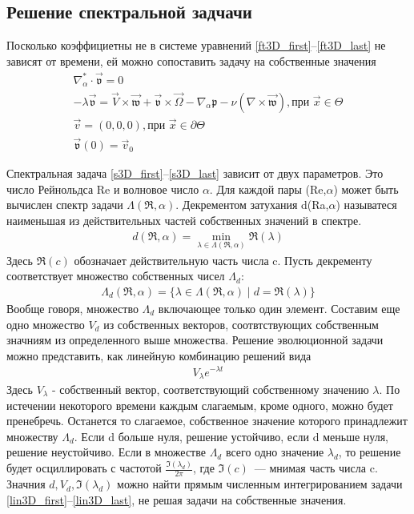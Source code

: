 \subsection{Решение спектральной задчачи}

Посколько коэффициетны не в системе уравнений \ref{ft3D_first}--\ref{ft3D_last} не зависят от времени, ей можно сопоставить задачу на собственные значения
\begin{gather} 
  \label{s3D_first}
  \nabla_\alpha^* \cdot  \mathfrak{\vec v} = 0\\
  - \lambda \mathfrak{\vec v} = \vec V \times \mathfrak{\vec w} + \mathfrak{\vec v} \times \vec \Omega - 
		\nabla_\alpha \mathfrak{p} - \nu ( \nabla \times \mathfrak{\vec w} ), \text{при } \vec x \in \Theta\\
  \vec v = (0,0,0), \text{при } \vec x \in \partial \Theta\\
  \mathfrak{\vec v} (0) = \vec v _0 \label{s3D_last}
\end{gather}


Спектральная задача \ref{s3D_first}--\ref{s3D_last} зависит от двух параметров. Это число Рейнольдса Re и волновое число $\alpha$. Для каждой пары (Re,$\alpha$) может быть вычислен спектр задачи $\Lambda(\Re,\alpha)$. Декрементом затухания d(Ra,$\alpha$) называтеся наименьшая из действительных частей собственных значений в спектре.
\begin{gather}
 d(\Re,\alpha) = \min_{\lambda \in \Lambda(\Re,\alpha)} \mathfrak{R}(\lambda)
\end{gather}
Здесь $\mathfrak{R}(c)$ обозначает действительную часть числа c. Пусть декременту соответствует множество собственных чисел $\Lambda_d$:
\begin{gather}
 \Lambda_d(\Re,\alpha) = \{ \lambda \in \Lambda(\Re,\alpha) \mid d = \mathfrak{R}(\lambda) \}
\end{gather}
Вообще говоря, множество $\Lambda_d$ включающее только один элемент.
Составим еще одно множество $V_d$ из собственных векторов, соотвтствующих собственным значниям из определенного выше множества. Решение эволюционной задачи можно представить, как линейную комбинацию решений вида 
\begin{gather}
 V_\lambda e^{-\lambda t}
\end{gather}
Здесь $V_\lambda$ - собственный вектор, соответствующий собственному значению $\lambda$. 
По истечении некоторого времени каждым слагаемым, кроме одного, можно будет пренебречь. Останется то слагаемое, собственное значение которого принадлежит множеству $\Lambda_d$. Если d больше нуля, решение устойчиво, если d 
меньше нуля, решение неустойчиво. Если в множестве $\Lambda_d$ всего одно значение $\lambda_d$, то 
решение будет осциллировать с частотой $\frac{\mathfrak{I}(\lambda_d)}{2\pi}$, где 
$\mathfrak{I}(c)$~--- мнимая часть числа c. Значния $d, V_d, \mathfrak{I}(\lambda_d)$ можно найти 
прямым численным интегрированием задачи \ref{lin3D_first}--\ref{lin3D_last}, не решая задачи на собственные значения.



